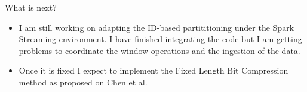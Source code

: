 \documentclass{beamer}
\begin{document}
\begin{frame}{What is next?}
    \begin{itemize}
        \item I am still working on adapting the ID-based partititioning under the Spark Streaming environment. I have finished integrating the code but I am getting problems to coordinate the window operations and the ingestion of the data.
        
        \item Once it is fixed I expect to implement the Fixed Length Bit Compression method as proposed on Chen et al.
    \end{itemize}
\end{frame}
\end{document}
